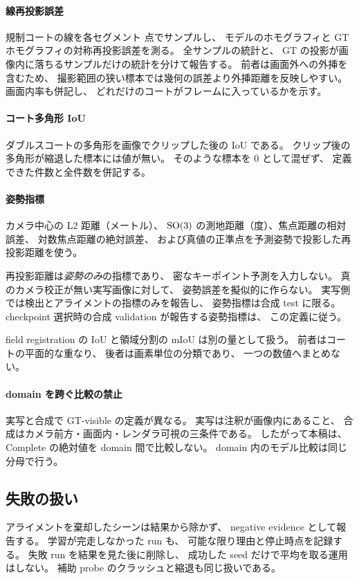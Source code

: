 \paragraph{線再投影誤差}
規制コートの線を各セグメント \resBenchLineSegmentSamples 点でサンプルし、
モデルのホモグラフィと GT ホモグラフィの対称再投影誤差を測る。
全サンプルの統計と、
GT の投影が画像内に落ちるサンプルだけの統計を分けて報告する。
前者は画面外への外挿を含むため、
撮影範囲の狭い標本では幾何の誤差より外挿距離を反映しやすい。
画面内率も併記し、
どれだけのコートがフレームに入っているかを示す。

\paragraph{コート多角形 IoU}
ダブルスコートの多角形を画像でクリップした後の IoU である。
クリップ後の多角形が縮退した標本には値が無い。
そのような標本を 0 として混ぜず、
定義できた件数と全件数を併記する。

\paragraph{姿勢指標}
カメラ中心の L2 距離（メートル）、
\(\mathrm{SO}(3)\) の測地距離（度）、焦点距離の相対誤差、
対数焦点距離の絶対誤差、
および真値の正準点を予測姿勢で投影した再投影距離を使う。

再投影距離は\emph{姿勢のみ}の指標であり、
密なキーポイント予測を入力しない。
真のカメラ校正が無い実写画像に対して、
姿勢誤差を擬似的に作らない。
実写側では検出とアライメントの指標のみを報告し、
姿勢指標は合成 test に限る。
checkpoint 選択時の合成 validation が報告する姿勢指標は、
この定義に従う。

field registration の IoU と領域分割の mIoU は別の量として扱う。
前者はコートの平面的な重なり、
後者は画素単位の分類であり、
一つの数値へまとめない。

\paragraph{domain を跨ぐ比較の禁止}
実写と合成で GT-visible の定義が異なる。
実写は注釈が画像内にあること、
合成はカメラ前方・画面内・レンダラ可視の三条件である。
したがって本稿は、
Complete の絶対値を domain 間で比較しない。
domain 内のモデル比較は同じ分母で行う。

\subsection{失敗の扱い}
\label{sec:failures}

アライメントを棄却したシーンは結果から除かず、
negative evidence として報告する。
学習が完走しなかった run も、
可能な限り理由と停止時点を記録する。
失敗 run を結果を見た後に削除し、
成功した seed だけで平均を取る運用はしない。
補助 probe のクラッシュと縮退も同じ扱いである。
